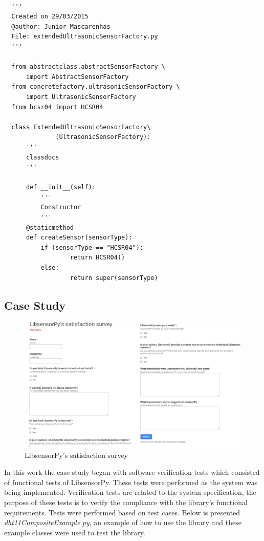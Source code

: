 \documentclass{acm_proc_article-sp}
\begin{document}
\renewcommand{\theFancyVerbLine}{
  \sffamily\textcolor[rgb]{0.5,0.5,0.5}{\scriptsize\arabic{FancyVerbLine}}}
\begin{verbatim}

  '''
  Created on 29/03/2015
  @author: Junior Mascarenhas
  File: extendedUltrasonicSensorFactory.py
  '''

  from abstractclass.abstractSensorFactory \
      import AbstractSensorFactory
  from concretefactory.ultrasonicSensorFactory \
      import UltrasonicSensorFactory
  from hcsr04 import HCSR04

  class ExtendedUltrasonicSensorFactory\
              (UltrasonicSensorFactory):
      '''
      classdocs
      '''

      def __init__(self):
          '''
          Constructor
          '''
      @staticmethod
      def createSensor(sensorType):
          if (sensorType == "HCSR04"):
                  return HCSR04()
          else:
                  return super(sensorType)
\end{verbatim}

\subsection{Case Study}
\begin{figure}[t]
    \centering
    	\includegraphics[width=1.0\textwidth]{pictures/survey2.png}
    		\caption{LibsensorPy's satisfaction survey}  
    		\label{fig:survey}  	
\end{figure}
In this work the case study began with software verification tests which consisted of functional tests of LibsensorPy. These tests were performed as the system was being implemented.
\newline
\newline
Verification tests are related to the system specification, the purpose of these tests is to verify the compliance with the library's functional requirements. Tests were performed based on test cases.
\newline
\newline
Below is presented \textit{dht11CompositeExample.py}, an example of how to use the library and these example classes were used to test the library.
\end{document}
